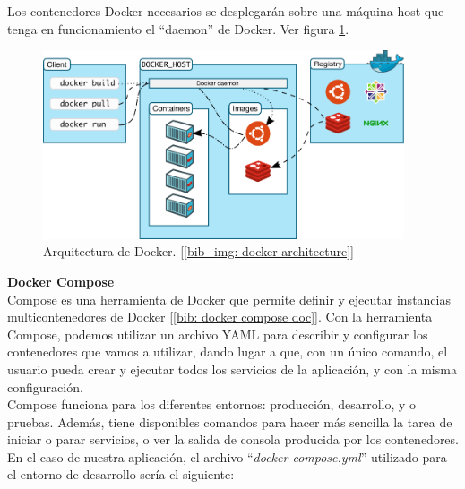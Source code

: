 \documentclass[a4paper, oneside, 12pt]{book}
\begin{document}
	\noindent Los contenedores Docker necesarios se desplegarán sobre una máquina host que tenga en funcionamiento el ``daemon'' de Docker. Ver figura \ref{img: docker arch}.
	
	\begin{figure}[h!]
		\begin{center}
			\includegraphics[width=0.95\textwidth]{img/architecture-docker.png}
			\caption{Arquitectura de Docker. [\ref{bib_img: docker architecture}]}
			\label{img: docker arch}
		\end{center}
	\end{figure}

	\pagebreak
	
	\noindent \textbf{\large Docker Compose} \\
	
	\noindent Compose es una herramienta de Docker que permite definir y ejecutar instancias multicontenedores de Docker [\ref{bib: docker compose doc}]. Con la herramienta Compose, podemos utilizar un archivo YAML para describir y configurar los contenedores que vamos a utilizar, dando lugar a que, con un único comando, el usuario pueda crear y ejecutar todos los servicios de la aplicación, y con la misma configuración. \\
	
	\noindent Compose funciona para los diferentes entornos: producción, desarrollo, y o pruebas. Además, tiene disponibles comandos para hacer más sencilla la tarea de iniciar o parar servicios, o ver la salida de consola producida por los contenedores. \\
	
	\noindent En el caso de nuestra aplicación, el archivo ``\textit{docker-compose.yml}'' utilizado para el entorno de desarrollo sería el siguiente:
	
\end{document}
